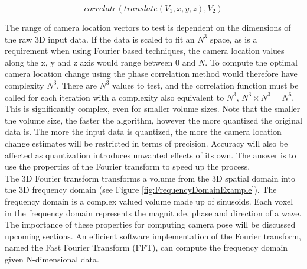 \begin{equation} \label{eqn:CrossCorrelationEquation11}
correlate(translate(V_1, x,y,z), V_2)
\end{equation}

The range of camera location vectors to test is dependent on the dimensions of the raw 3D input data. If the data is scaled to fit an $N^3$ space, as is a requirement when using Fourier based techniques, the camera location values along the x, y and z axis would range between 0 and $N$. To compute the optimal camera location change using the phase correlation method would therefore have complexity $N^3$. There are $N^3$ values to test, and the correlation function must be called for each iteration with a complexity also equivalent to $N^3$, $N^3 \times N^3 = N^6$. This is significantly complex, even for smaller volume sizes. Note that the smaller the volume size, the faster the algorithm, however the more quantized the original data is. The more the input data is quantized, the more the camera location change estimates will be restricted in terms of precision. Accuracy will also be affected as quantization introduces unwanted effects of its own. The answer is to use the properties of the Fourier transform to speed up the process.  \\

The 3D Fourier transform transforms a volume from the 3D spatial domain into the 3D frequency domain (see Figure \ref{fig:FrequencyDomainExample}). The frequency domain is a complex valued volume made up of sinusoids. Each voxel in the frequency domain represents the magnitude, phase and direction of a wave. The importance of these properties for computing camera pose will be discussed upcoming sections. An efficient software implementation of the Fourier transform, named the Fast Fourier Transform (FFT), can compute the frequency domain given N-dimensional data. \\


